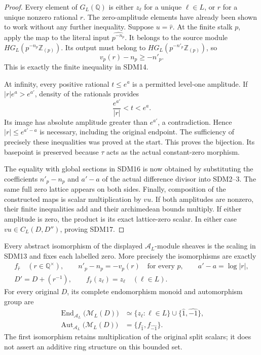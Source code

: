 \begin{proof}
Every element of $G_L(\mathbb Q)$ is either $z_\ell$ for a unique
$\ell\in L$, or $\widehat r$ for a unique nonzero rational $r$.
The zero-amplitude elements have already been shown to work without
any further inequality. Suppose $u=\widehat r$. At the finite
stalk $p$, apply the map to the literal input
$\widehat{p^{-n_p}}$. It belongs to the source module
$HG_L(p^{-n_p}\mathbb Z_{(p)})$. Its output must belong to
$HG_L(p^{-n'_p}\mathbb Z_{(p)})$, so
\[
v_p(r)-n_p\ge-n'_p.
\]
This is exactly the finite inequality in SDM14.

At infinity, every positive rational $t\le e^a$ is a permitted
level-one amplitude. If $|r|e^a>e^{a'}$, density of the rationals
provides
\[
\frac{e^{a'}}{|r|}<t<e^a.
\]
Its image has absolute amplitude greater than $e^{a'}$, a
contradiction. Hence $|r|\le e^{a'-a}$ is necessary, including
the original endpoint. The sufficiency of precisely these
inequalities was proved at the start. This proves the bijection.
Its basepoint is preserved because $\tau$ acts as the actual
constant-zero morphism.

The equality with global sections in SDM16 is now obtained by
substituting the coefficients $n'_p-n_p$ and $a'-a$ of the
actual difference divisor into SDM2--3. The same full zero lattice
appears on both sides. Finally, composition of the constructed maps
is scalar multiplication by $vu$. If both amplitudes are nonzero,
their finite inequalities add and their archimedean bounds multiply.
If either amplitude is zero, the product is its exact lattice-zero
scalar. In either case $vu\in C_L(D,D'')$, proving SDM17.
\end{proof}

\begin{corollary}\label{SDM:all-isomorphisms}
Every abstract isomorphism of the displayed
$\mathcal A_L$-module sheaves is the scaling in SDM13 and fixes
each labelled zero. More precisely the isomorphisms are exactly
\begin{equation}\tag{SDM18}
\begin{gathered}
f_{\widehat r}\quad(r\in\mathbb Q^\times),\qquad
n'_p-n_p=-v_p(r)\quad\text{for every }p,\qquad
a'-a=\log|r|,\\
D'=D+(r^{-1}),\qquad
f_{\widehat r}(z_\ell)=z_\ell\quad(\ell\in L).
\end{gathered}
\end{equation}
For every original $D$, its complete endomorphism monoid and
automorphism group are
\begin{equation}\tag{SDM19}
\begin{aligned}
\operatorname{End}_{\mathcal A_L}\bigl(\mathcal M_L(D)\bigr)
 &\simeq \{z_\ell:\ell\in L\}\cup
                 \{\widehat1,\widehat{-1}\},\\
\operatorname{Aut}_{\mathcal A_L}\bigl(\mathcal M_L(D)\bigr)
 &=\{f_{\widehat1},f_{\widehat{-1}}\}.
\end{aligned}
\end{equation}
The first isomorphism retains multiplication of the original split
scalars; it does not assert an additive ring structure on this
bounded set.
\end{corollary}

